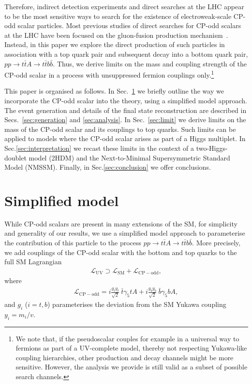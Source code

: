 \documentclass[preprintnumbers,superscriptaddress,nofootinbib,aps,prd,floatfix]{revtex4}
\begin{document}
Therefore, indirect detection experiments and direct searches at the LHC appear to be the most sensitive ways to search for the existence of electroweak-scale CP-odd scalar particles. Most previous studies of direct searches for CP-odd scalars at the LHC have been focused on the gluon-fusion production mechanism~\cite{Klamke:2007cu,Dolan:2014upa}. Instead, in this paper we explore the direct production of such particles in association with a top quark pair and subsequent decay into a bottom quark pair, $p p \to t \bar{t} A \to t \bar{t} b \bar{b}$. Thus, we derive limits on the mass and coupling strength of the CP-odd scalar in a process with unsuppressed fermion couplings only.\footnote{We note that, if the pseudoscalar couples for example in a universal way to fermions as part of a UV-complete model, thereby not respecting Yukawa-like coupling hierarchies, other production and decay channels might be more sensitive. However, the analysis we provide is still valid as a subset of possible search channels.}

This paper is organised as follows. In Sec.~\ref{sec:model} we briefly outline the way we incorporate the CP-odd scalar into the theory, using a simplified model approach. The event generation and details of the final state reconstruction are described in Secs.~\ref{sec:generation} and \ref{sec:analysis}. In Sec.~\ref{sec:limit} we derive limits on the mass of the CP-odd scalar and its couplings to top quarks. Such limits can be applied to models where the CP-odd scalar arises as part of a Higgs multiplet. In Sec.\ref{sec:interpretation} we recast these limits in the context of a two-Higgs-doublet model (2HDM) and the 
Next-to-Minimal Supersymmetric Standard Model (NMSSM). Finally, in Sec.\ref{sec:conclusion} we offer conclusions.

\section{Simplified model}
\label{sec:model}
While CP-odd scalars are present in many extensions of the SM, for simplicity and generality of our results, we use a simplified model approach \cite{Alves:2011wf} to parameterise the contribution of this particle to the process $p p \to t \bar{t} A \to t \bar{t} b \bar{b}$. More precisely, we add couplings of the CP-odd scalar with the bottom and top quarks to the full SM Lagrangian 
\begin{eqnarray}
\mathcal{L}_{\mathrm{UV}} \supset \mathcal{L}_{\mathrm{SM}} + \mathcal{L}_{\mathrm{CP-odd}},
\label{eq:lagrangian}
\end{eqnarray}
where 
\begin{eqnarray}
\mathcal{L}_{\mathrm{CP-odd}} = i \frac{g_{t} y_t}{\sqrt{2}}~\bar{t} \gamma_5 t A + i \frac{g_{b} y_b}{\sqrt{2}}~\bar{b} \gamma_5 b A,
\end{eqnarray}
and $g_i$ ($i=t,b$) parameterises the deviation from the SM Yukawa coupling  $y_i = m_i/v$.
\end{document}
